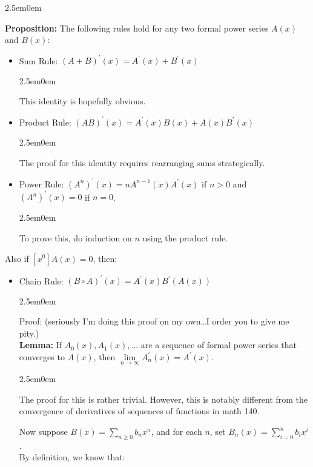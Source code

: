 \documentclass{book}
\newcommand{\hTwo}{%
\color{MidnightBlue}%
   \fontsize{13}{15}\selectfont%
}
\newcommand{\hThree}{%
   \color{PineGreen!85!Orange}
   \fontsize{12}{14}\selectfont%
}
\newcommand{\hFour}{%
   \color{Cyan}
   \fontsize{12}{14}\selectfont%
}
\newcommand{\myComment}{%
   \color{RawerSienna}%
   \fontsize{12}{14}\selectfont%
}
\newenvironment{myIndent}{%
   \begin{adjustwidth}{2.5em}{0em}%
}{%
   \end{adjustwidth}%
}
\newcommand{\blab}[1]{\textbf{#1}}
\newcommand{\retTwo}{\hfill\bigbreak}
\begin{document}
\begin{myIndent}\hTwo
   \blab{Proposition:} The following rules hold for any two formal power series $A(x)$ and $B(x)$:
   \begin{itemize}
      \item Sum Rule: $(A + B)^\prime(x) = A^\prime(x) + B^\prime(x)$
      \begin{myIndent}\hThree
         This identity is hopefully obvious.\\ [-12pt]
      \end{myIndent}
      \item Product Rule: $(AB)^\prime(x) = A^\prime(x) B(x) + A(x) B^\prime(x)$
      \begin{myIndent}\hThree
         The proof for this identity requires rearranging sums strategically.\\ [-12pt]
      \end{myIndent}
      \item Power Rule: $(A^n)^\prime(x) = n A^{n-1}(x) A^\prime(x)$ if $n > 0$ and $(A^n)^\prime(x) = 0$ if $n = 0$.
      \begin{myIndent}\hThree
         To prove this, do induction on $n$ using the product rule.\newpage
      \end{myIndent}
   \end{itemize}
   
   Also if $[x^0]A(x) = 0$, then:
   \begin{itemize}
      \item Chain Rule: $(B \circ A)^\prime(x) = A^\prime(x) B^\prime(A(x))$
      
      \begin{myIndent}\hThree
         Proof: {\myComment(seriously I'm doing this proof on my own\dots I order you to give me pity.)}\\ [-6pt]

         \blab{Lemma:} If $A_0(x), A_1(x), \ldots$ are a sequence of formal power series that\\ converges to $A(x)$, then $\lim\limits_{n \rightarrow \infty} A_n^\prime(x) = A^\prime(x)$.

         \begin{myIndent}\hFour
            The proof for this is rather trivial. However, this is notably different from the convergence of derivatives of sequences of functions in math 140.\retTwo
         \end{myIndent}

         Now suppose $B(x) = \sum\limits_{n \geq 0}b_nx^n$, and for each $n$, set $B_n(x) = \sum\limits_{i = 0}^n b_i x^i$.\\ [2pt]
         By definition, we know that:\\ [-18pt]
         

\end{myIndent}
\end{itemize}
\end{myIndent}
\end{document}
